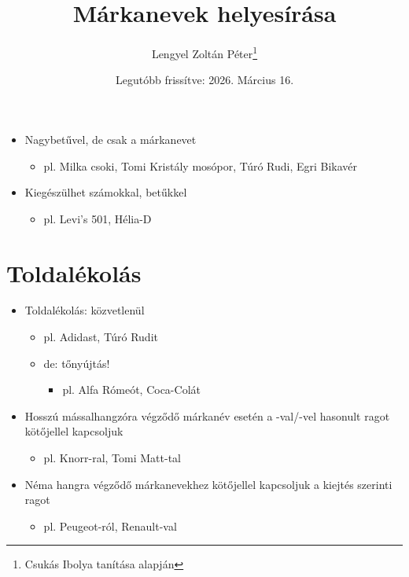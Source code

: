 \documentclass{article}
\title{Márkanevek helyesírása}
\author{Lengyel Zoltán Péter\thanks{Csukás Ibolya tanítása alapján}}
\date{Legutóbb frissítve: 2026. Március 16.}
\begin{document}
\maketitle
\tableofcontents
\newpage

\begin{itemize}
    \item Nagybetűvel, de csak a márkanevet
    \begin{itemize}
        \item pl. Milka csoki, Tomi Kristály mosópor, Túró Rudi, Egri Bikavér
    \end{itemize}
    \item Kiegészülhet számokkal, betűkkel
    \begin{itemize}
        \item pl. Levi's 501, Hélia-D
    \end{itemize}
\end{itemize}

\section{Toldalékolás}
\begin{itemize}
    \item Toldalékolás: közvetlenül
    \begin{itemize}
        \item pl. Adidast, Túró Rudit
        \item de: tőnyújtás! 
        \begin{itemize}
            \item pl. Alfa Rómeót, Coca-Colát
        \end{itemize}
    \end{itemize}
    \item Hosszú mássalhangzóra végződő márkanév esetén a -val/-vel hasonult ragot kötőjellel kapcsoljuk 
    \begin{itemize}
        \item pl. Knorr-ral, Tomi Matt-tal
    \end{itemize}
    \item Néma hangra végződő márkanevekhez kötőjellel kapcsoljuk a kiejtés szerinti ragot
    \begin{itemize}
        \item pl. Peugeot-ról, Renault-val
    \end{itemize}
\end{itemize}
\end{document}
